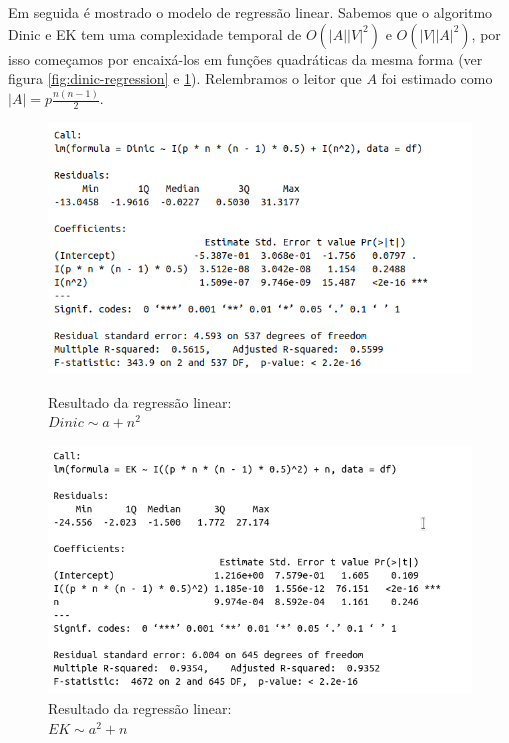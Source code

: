 \documentclass{uofa-eng-assignment}
\begin{document}
Em seguida é mostrado o modelo de regressão linear. Sabemos que o algoritmo Dinic e EK tem uma complexidade temporal de $O(|A||V|^2)$ e $O(|V||A|^2)$, por isso começamos por encaixá-los em funções quadráticas da mesma forma (ver figura \ref{fig:dinic-regression} e \ref{fig:ek-regression}). Relembramos o leitor que $A$ foi estimado como $|A|=p\frac{n(n-1)}{2}$.
\begin{figure}[h]
    \centering
    \begin{minipage}{0.45\textwidth}
        \centering
        \includegraphics[width=1.1\textwidth]{dinic_a+n^2_lm.png}
        \captionsetup{justification=centering}
        \caption{Resultado da regressão linear: \\$Dinic \sim a + n^2$}
        \label{fig:dinic-regression}
    \end{minipage}
    \hfill
    \begin{minipage}{0.45\textwidth}
        \centering
        \includegraphics[width=1.1\textwidth]{ek_a^2+n_lm.png}
        \captionsetup{justification=centering}
        \caption{Resultado da regressão linear: \\$EK \sim a^2 + n$}
        \label{fig:ek-regression}
    \end{minipage}
\end{figure}
\end{document}

